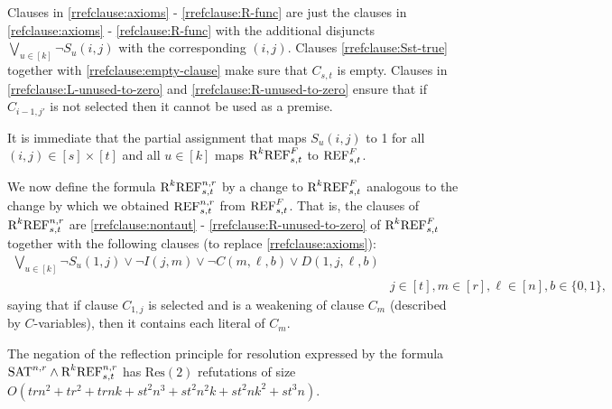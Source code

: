 Clauses in \eqref{rrefclause:axioms} - \eqref{rrefclause:R-func} are just the clauses in \eqref{refclause:axioms} - \eqref{refclause:R-func} with the additional disjuncts $\bigvee_{u \in [k]} \neg S_u(i,j)$ with the corresponding $(i,j)$. Clauses \eqref{rrefclause:Sst-true} together with \eqref{rrefclause:empty-clause} make sure that $C_{s,t}$ is empty. Clauses in \eqref{rrefclause:L-unused-to-zero} and \eqref{rrefclause:R-unused-to-zero} ensure that if $C_{i-1,j'}$ is not selected then it cannot be used as a premise.

It is immediate that the partial assignment that maps $S_u(i,j)$ to 1 for all $(i,j) \in [s] \times [t]$ and all $u \in [k]$ maps $\textnormal{R}^k\textnormal{REF}^{F}_{s,t}$ to $\textnormal{REF}^{F}_{s,t}$.

We now define the formula $\textnormal{R}^k\textnormal{REF}^{n,r}_{s,t}$ by a change to $\textnormal{R}^k\textnormal{REF}^{F}_{s,t}$ analogous to the change by which we obtained $\textnormal{REF}^{n,r}_{s,t}$ from $\textnormal{REF}^{F}_{s,t}$. That is, the clauses of $\textnormal{R}^k\textnormal{REF}^{n,r}_{s,t}$ are \eqref{rrefclause:nontaut} - \eqref{rrefclause:R-unused-to-zero} of $\textnormal{R}^k\textnormal{REF}^{F}_{s,t}$ together with the following clauses (to replace \eqref{rrefclause:axioms}):
\begin{equation}
\begin{split}
\label{rrefclause-n-r:axioms}
\bigvee_{u \in [k]} \neg S_u(1,j) \lor \neg I(j,m) \lor \neg C(m,\ell,b) \lor D(1,j,\ell,b)  \\
  & j \! \in \! [t], m \! \in \! [r], \ell \! \in \! [n], b \! \in \! \{0,1\},
\end{split}
\end{equation}
saying that if clause $C_{1,j}$ is selected and is a weakening of clause $C_m$ (described by $C$-variables), then it contains each literal of $C_m$.


\begin{theorem}
\label{thm:refl-princ-Upper-bound}
The negation of the reflection principle for resolution expressed by the formula $\textnormal{SAT}^{n,r} \land \textnormal{R}^k\textnormal{REF}^{n,r}_{s,t}$ has $\text{Res}(2)$ refutations of size $O(trn^2 + tr^2 + trnk + st^2n^3 + st^2n^2k + st^2nk^2 + st^3n)$.
\end{theorem}

